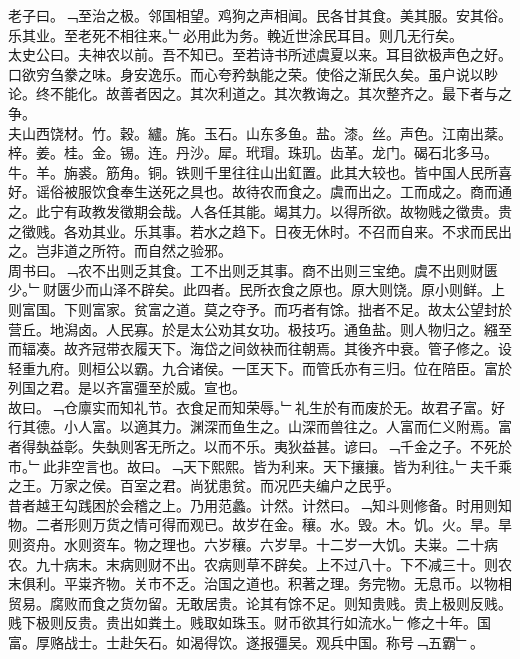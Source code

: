 \documentclass{zhvt-classic}
\begin{document}

\hspace*{2em}老子曰。﹁至治之极。邻国相望。鸡狗之声相闻。民各甘其食。美其服。安其俗。乐其业。至老死不相往来。﹂必用此为务。輓近世涂民耳目。则几无行矣。\\
\hspace*{2em}太史公曰。夫神农以前。吾不知已。至若诗书所述虞夏以来。耳目欲极声色之好。口欲穷刍豢之味。身安逸乐。而心夸矜埶能之荣。使俗之渐民久矣。虽户说以眇论。终不能化。故善者因之。其次利道之。其次教诲之。其次整齐之。最下者与之争。\\
\hspace*{2em}夫山西饶材。竹。穀。纑。旄。玉石。山东多鱼。盐。漆。丝。声色。江南出棻。梓。姜。桂。金。锡。连。丹沙。犀。玳瑁。珠玑。齿革。龙门。碣石北多马。牛。羊。旃裘。筋角。铜。铁则千里往往山出釭置。此其大较也。皆中国人民所喜好。谣俗被服饮食奉生送死之具也。故待农而食之。虞而出之。工而成之。商而通之。此宁有政教发徵期会哉。人各任其能。竭其力。以得所欲。故物贱之徵贵。贵之徵贱。各劝其业。乐其事。若水之趋下。日夜无休时。不召而自来。不求而民出之。岂非道之所符。而自然之验邪。\\
\hspace*{2em}周书曰。﹁农不出则乏其食。工不出则乏其事。商不出则三宝绝。虞不出则财匮少。﹂财匮少而山泽不辟矣。此四者。民所衣食之原也。原大则饶。原小则鲜。上则富国。下则富家。贫富之道。莫之夺予。而巧者有馀。拙者不足。故太公望封於营丘。地潟卤。人民寡。於是太公劝其女功。极技巧。通鱼盐。则人物归之。繦至而辐凑。故齐冠带衣履天下。海岱之间敛袂而往朝焉。其後齐中衰。管子修之。设轻重九府。则桓公以霸。九合诸侯。一匡天下。而管氏亦有三归。位在陪臣。富於列国之君。是以齐富彊至於威。宣也。\\
\hspace*{2em}故曰。﹁仓廪实而知礼节。衣食足而知荣辱。﹂礼生於有而废於无。故君子富。好行其德。小人富。以適其力。渊深而鱼生之。山深而兽往之。人富而仁义附焉。富者得埶益彰。失埶则客无所之。以而不乐。夷狄益甚。谚曰。﹁千金之子。不死於市。﹂此非空言也。故曰。﹁天下熙熙。皆为利来。天下攘攘。皆为利往。﹂夫千乘之王。万家之侯。百室之君。尚犹患贫。而况匹夫编户之民乎。\\
\hspace*{2em}昔者越王勾践困於会稽之上。乃用范蠡。计然。计然曰。﹁知斗则修备。时用则知物。二者形则万货之情可得而观已。故岁在金。穰。水。毁。木。饥。火。旱。旱则资舟。水则资车。物之理也。六岁穰。六岁旱。十二岁一大饥。夫粜。二十病农。九十病末。末病则财不出。农病则草不辟矣。上不过八十。下不减三十。则农末俱利。平粜齐物。关市不乏。治国之道也。积著之理。务完物。无息币。以物相贸易。腐败而食之货勿留。无敢居贵。论其有馀不足。则知贵贱。贵上极则反贱。贱下极则反贵。贵出如粪土。贱取如珠玉。财币欲其行如流水。﹂修之十年。国富。厚赂战士。士赴矢石。如渴得饮。遂报彊吴。观兵中国。称号﹁五霸﹂。\\
\end{document}
